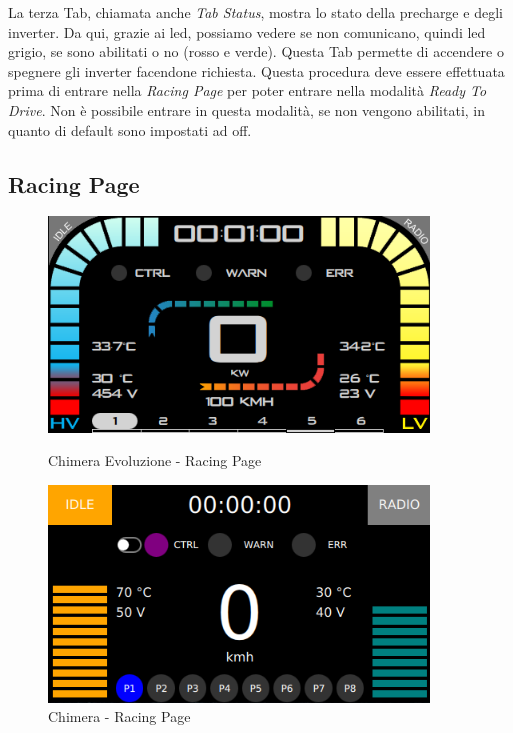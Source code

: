 La terza Tab, chiamata anche \emph{Tab Status}, mostra lo stato della precharge e degli inverter.
Da qui, grazie ai led, possiamo vedere se non comunicano, quindi led grigio, se sono abilitati o no (rosso e verde).
Questa Tab permette di accendere o spegnere gli inverter facendone richiesta.
Questa procedura deve essere effettuata prima di entrare nella \emph{Racing Page} per poter entrare nella modalità \emph{Ready To Drive}.
Non è possibile entrare in questa modalità, se non vengono abilitati, in quanto di default sono impostati ad off.

\subsection{Racing Page}

\begin{figure}[h!]
    \centering
    \begin{minipage}{0.5\textwidth}
        \centering
        \includegraphics[width=0.9\textwidth]{./figures/UI/racingPage.png}        
        \caption{Chimera Evoluzione - Racing Page}    
    \end{minipage}\hfill
    \begin{minipage}{0.5\textwidth}
        \centering
        \includegraphics[width=0.9\textwidth]{./figures/oldUI/racingPage.png}
        \caption{Chimera - Racing Page}
    \end{minipage}
\end{figure}

